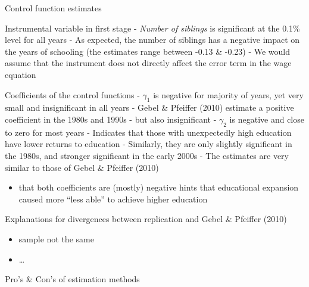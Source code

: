 \documentclass[10pt,ignorenonframetext,]{beamer}
\providecommand{\tightlist}{%
  \setlength{\itemsep}{0pt}\setlength{\parskip}{0pt}}
\begin{document}
\begin{frame}[allowframebreaks]{Control function estimates}
\protect\hypertarget{control-function-estimates}{}

Instrumental variable in first stage - \emph{Number of siblings} is
significant at the 0.1\% level for all years - As expected, the number
of siblings has a negative impact on the years of schooling (the
estimates range between -0.13 \& -0.23) - We would assume that the
instrument does not directly affect the error term in the wage equation

Coefficients of the control functions - \(\gamma_1\) is negative for
majority of years, yet very small and insignificant in all years - Gebel
\& Pfeiffer (2010) estimate a positive coefficient in the 1980s and
1990s - but also insignificant - \(\gamma_2\) is negative and close to
zero for most years - Indicates that those with unexpectedly high
education have lower returns to education - Similarly, they are only
slightly significant in the 1980s, and stronger significant in the early
2000s - The estimates are very similar to those of Gebel \& Pfeiffer
(2010)

\begin{itemize}
\tightlist
\item
  that both coefficients are (mostly) negative hints that educational
  expansion caused more ``less able'' to achieve higher education
\end{itemize}

\end{frame}

\begin{frame}{Explanations for divergences between replication and Gebel
\& Pfeiffer (2010)}
\protect\hypertarget{explanations-for-divergences-between-replication-and-gebel-pfeiffer-2010}{}

\begin{itemize}
\tightlist
\item
  sample not the same
\item
  \ldots{}
\end{itemize}

\end{frame}

\begin{frame}{Pro's \& Con's of estimation methods}
\protect\hypertarget{pros-cons-of-estimation-methods}{}

\end{frame}
\end{document}
